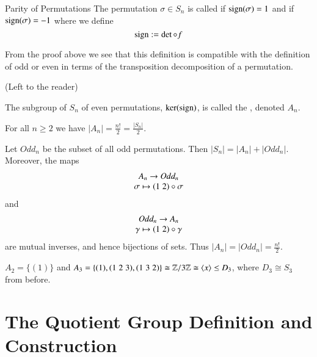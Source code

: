 \documentclass[12pt, a4paper, twoside, openright, titlepage]{book}
\begin{document}
\begin{defn}{Parity of Permutations}{}
        The permutation $\sigma \in S_n$ is called  if $\operatorname{sign}(\sigma) = 1$ and  if $\operatorname{sign}(\sigma) = -1$ where we define \begin{equation}
                \operatorname{sign} := \det \circ f
        \end{equation}
\end{defn}

\begin{rmk}{}{}
        From the proof above we see that this definition is compatible with the definition of odd or even in terms of the transposition decomposition of a permutation.
\end{rmk}
\begin{proof*}{}{}
        (Left to the reader)
\end{proof*}


\begin{defn}{}{}
        The subgroup of $S_n$ of even permutations, $\ker(\operatorname{sign})$, is called the , denoted $A_n$.
\end{defn}


\begin{prop}{}{}
        For all $n \geq 2$ we have $|A_n| = \frac{n!}{2} = \frac{|S_n|}{2}$.
\end{prop}
\begin{proof*}{}{}
        Let $Odd_n$ be the subset of all odd permutations. Then $|S_n| = |A_n| + |Odd_n|$. Moreover, the maps \begin{equation}
                \begin{array}{c} A_n\rightarrow Odd_n \\ \sigma \mapsto (1\;2)\circ \sigma \end{array}
        \end{equation}
        and \begin{equation}
                \begin{array}{c} Odd_n\rightarrow A_n \\ \gamma \mapsto (1\;2)\circ \gamma \end{array}
        \end{equation}
        are mutual inverses, and hence bijections of sets. Thus $|A_n| = |Odd_n| = \frac{n!}{2}$.
\end{proof*}

\begin{eg}{}{}
        $A_2 = \{(1)\}$ and $A_3 = \{(1),(1\;2\;3),(1\;3\;2)\} \cong \mathbb Z/3\mathbb Z \cong \langle x\rangle \leq D_3$, where $D_3 \cong S_3$ from before.
\end{eg}




\section{\textsection The Quotient Group Definition and Construction}
\end{document}
